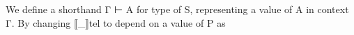 \begin{code}%
%
\>[2]\AgdaSpace{}%
\AgdaSpace{}%
\AgdaSymbol{(}\AgdaSpace{}%
\AgdaSymbol{:}\AgdaSpace{}%
\AgdaSymbol{)}\AgdaSpace{}%
\AgdaSymbol{:}\AgdaSpace{}%
\<%
\\
%
\>[2]\AgdaSpace{}%
\AgdaSymbol{:}\AgdaSpace{}%
\AgdaSpace{}%
\AgdaSpace{}%
\AgdaSpace{}%
\AgdaSpace{}%
\AgdaSpace{}%
\<%
\\
%
\>[2]\AgdaSpace{}%
\AgdaSymbol{:}\AgdaSpace{}%
\AgdaSpace{}%
\AgdaSpace{}%
\AgdaSpace{}%
\AgdaSpace{}%
\AgdaSpace{}%
\AgdaSpace{}%
\AgdaSpace{}%
\<%
\\
%
\>[2]\AgdaSpace{}%
\AgdaSpace{}%
\AgdaSpace{}%
\AgdaSymbol{=}\AgdaSpace{}%
\AgdaSpace{}%
\AgdaSymbol{\AgdaUnderscore{}}\AgdaSpace{}%
\AgdaSpace{}%
\AgdaSpace{}%
\AgdaSpace{}%
\AgdaSpace{}%
\<%
\\
\>[0]\<%
\\
%
\>[2]\AgdaSpace{}%
\AgdaSpace{}%
\AgdaSpace{}%
\<%
\\
\>[2][@{}l@{\AgdaIndent{0}}]%
\>[4]%
\>[9]\AgdaSymbol{:}\AgdaSpace{}%
\AgdaSpace{}%
\<%
\\
%
\>[4]%
\>[9]\AgdaSymbol{:}\AgdaSpace{}%
\AgdaSymbol{(}\AgdaSpace{}%
\AgdaSymbol{:}\AgdaSpace{}%
\AgdaSpace{}%
\AgdaSymbol{)}\AgdaSpace{}%
\AgdaSymbol{(}\AgdaSpace{}%
\AgdaSymbol{:}\AgdaSpace{}%
\AgdaSpace{}%
\AgdaSpace{}%
\AgdaSymbol{)}\AgdaSpace{}%
\AgdaSpace{}%
\AgdaSpace{}%
\<%
\end{code}
We define a shorthand Γ ⊢ A for type of S, representing a value of A in context Γ. By changing ⟦\_⟧tel to depend on a value of P as
